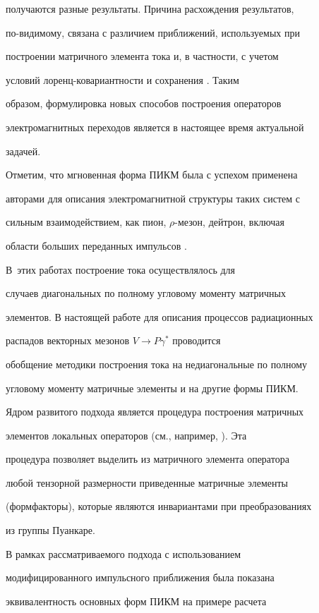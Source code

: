получаются разные результаты. Причина расхождения результатов,

по-видимому, связана с различием приближений, используемых при

построении матричного элемента тока и, в частности, с учетом

условий лоренц-ковариантности и сохранения \cite{KrT09}. Таким

образом, формулировка новых  способов построения операторов

электромагнитных переходов является в настоящее время актуальной

задачей.



Отметим, что мгновенная форма ПИКМ была с успехом применена

авторами для описания электромагнитной структуры таких систем с

сильным взаимодействием, как пион, $\rho$-мезон, дейтрон, включая

области больших переданных импульсов \cite{KrT09, KrTrTs09}. 

В~этих работах построение тока осуществлялось для

случаев диагональных по полному угловому моменту матричных

элементов. В настоящей работе для описания процессов радиационных

распадов векторных мезонов $V  \to  P \gamma^{*}$ проводится

обобщение методики построения тока на недиагональные по полному

угловому моменту матричные элементы и на другие формы ПИКМ.



Ядром развитого подхода является  процедура построения матричных

элементов локальных операторов (см., например, \cite{KrT09}). Эта

процедура позволяет выделить из матричного элемента оператора

любой тензорной размерности приведенные матричные элементы

(формфакторы), которые являются инвариантами при преобразованиях

из группы Пуанкаре.



В рамках рассматриваемого подхода с использованием

модифицированного импульсного приближения была показана

эквивалентность основных форм ПИКМ на примере расчета

